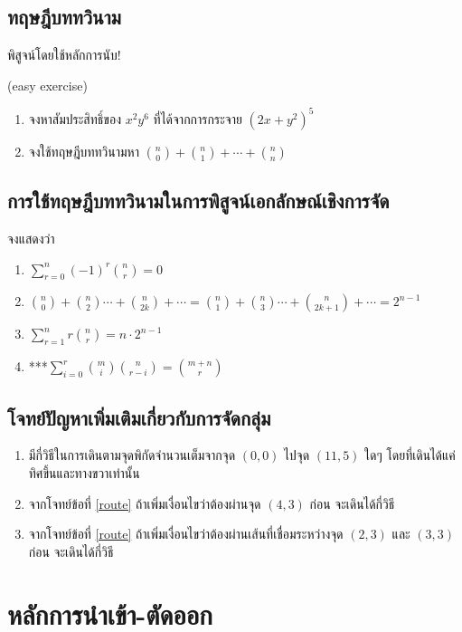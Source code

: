 \subsection{ทฤษฎีบททวินาม}
พิสูจน์โดยใช้หลักการนับ!

\begin{exam}(easy exercise)
	\begin{enumerate}
		\item จงหาสัมประสิทธิ์ของ $ x^2y^6 $ ที่ได้จากการกระจาย $ (2x+y^2)^5 $
		\item จงใช้ทฤษฎีบททวินามหา $ \binom{n}{0}+\binom{n}{1}+\cdots+\binom{n}{n} $
	\end{enumerate}
\end{exam}
\subsection{การใช้ทฤษฎีบททวินามในการพิสูจน์เอกลักษณ์เชิงการจัด}
\begin{exam}
	จงแสดงว่า\begin{enumerate}
		\item $ \sum_{r=0}^n (-1)^r\binom{n}{r}=0 $
		\item $ \binom{n}{0}+\binom{n}{2}\cdots+\binom{n}{2k}+\cdots = \binom{n}{1}+\binom{n}{3}\cdots+\binom{n}{2k+1}+\cdots = 2^{n-1} $
		\item $ \sum_{r=1}^n r\binom{n}{r}=n\cdot2^{n-1} $
		\item ***$ \sum_{i=0}^r\binom{m}{i}\binom{n}{r-i}=\binom{m+n}{r} $
	\end{enumerate}
\end{exam}

\subsection{โจทย์ปัญหาเพิ่มเติมเกี่ยวกับการจัดกลุ่ม}
\begin{exam}
	\begin{enumerate}
		\item \label{route} มีกี่วิธีในการเดินตามจุดพิกัดจำนวนเต็มจากจุด $ (0,0) $ ไปจุด $ (11,5) $ ใดๆ โดยที่เดินได้แค่ทิศขึ้นและทางขวาเท่านั้น
		\item จากโจทย์ข้อที่ \ref{route} ถ้าเพิ่มเงื่อนไขว่าต้องผ่านจุด $ (4,3) $ ก่อน จะเดินได้กี่วิธี
		\item จากโจทย์ข้อที่ \ref{route} ถ้าเพิ่มเงื่อนไขว่าต้องผ่านเส้นที่เชื่อมระหว่างจุด $ (2,3) $ และ $ (3,3) $ ก่อน จะเดินได้กี่วิธี
	\end{enumerate}
\end{exam}

\section{หลักการนำเข้า-ตัดออก}